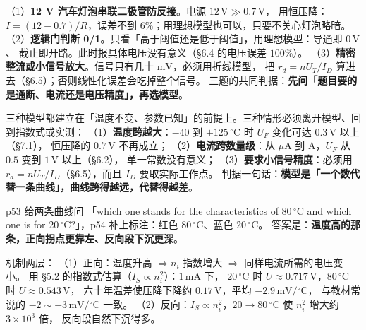 \documentclass[11pt]{ctexart}
\begin{document}

（1）\textbf{12 V 汽车灯泡串联二极管防反接}。电源 $12\,\mathrm{V}\gg0.7\,\mathrm{V}$，
用恒压降：$I=(12-0.7)/R$，误差不到 $6\%$；用理想模型也可以，只要不关心灯泡略暗。
（2）\textbf{逻辑门判断 0/1}。只看「高于阈值还是低于阈值」，用理想模型：导通即 $0\,\mathrm{V}$、
截止即开路。此时报具体电压没有意义（§6.4 的电压误差 $100\%$）。
（3）\textbf{精密整流或小信号放大}。信号只有几十 $\mathrm{mV}$，必须用折线模型，
把 $r_d=nU_T/I_D$ 算进去（§6.5）；否则线性化误差会吃掉整个信号。
三题的共同判据：\textbf{先问「题目要的是通断、电流还是电压精度」，再选模型}。


三种模型都建立在「温度不变、参数已知」的前提上。三种情形必须离开模型、回到指数式或实测：
（1）\textbf{温度跨越大}：$-40$ 到 $+125\,{}^\circ\mathrm{C}$ 时 $U_F$ 变化可达 $0.3\,\mathrm{V}$ 以上（§7.1），
恒压降的 $0.7\,\mathrm{V}$ 不再成立；
（2）\textbf{电流跨数量级}：从 $\mu\mathrm{A}$ 到 A，$U_F$ 从 $0.5$ 变到 $1\,\mathrm{V}$ 以上（§6.2），
单一常数没有意义；
（3）\textbf{要求小信号精度}：必须用 $r_d=nU_T/I_D$（§6.5），而且 $I_D$ 要取实际工作点。
判据一句话：\textbf{模型是「一个数代替一条曲线」，曲线跨得越远，代替得越差}。



p53 给两条曲线问 「which one stands for the characteristics of 80\,$^\circ$C and which one is for
20\,$^\circ$C?」，p54 补上标注：红色 $80\,{}^\circ\mathrm{C}$、蓝色 $20\,{}^\circ\mathrm{C}$。
答案是：\textbf{温度高的那条，正向拐点更靠左、反向段下沉更深}。

机制两层：
（1）正向：温度升高 $\Rightarrow n_i$ 指数增大 $\Rightarrow$ 同样电流所需的电压变小。
用 §5.2 的指数式估算（$I_S\propto n_i^2$）：$1\,\mathrm{mA}$ 下，
$20\,{}^\circ\mathrm{C}$ 时 $U\approx0.717\,\mathrm{V}$，$80\,{}^\circ\mathrm{C}$ 时 $U\approx0.543\,\mathrm{V}$，
六十年温差使压降下降约 $0.17\,\mathrm{V}$，平均 $-2.9\,\mathrm{mV}/{}^\circ\mathrm{C}$，
与教材常说的 $-2\sim-3\,\mathrm{mV}/{}^\circ\mathrm{C}$ 一致。
（2）反向：$I_S\propto n_i^2$，$20\to80\,{}^\circ\mathrm{C}$ 使 $n_i^2$ 增大约 $3\times10^{3}$ 倍，
反向段自然下沉得多。


\end{document}
